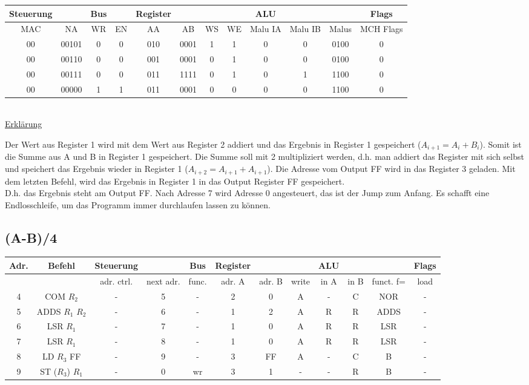 \documentclass[paper=a4, fontsize=11pt]{scrartcl}
\numberwithin{equation}{section}
\numberwithin{figure}{section}
\numberwithin{table}{section}
\begin{document}
\begin{tabular}{|cc|cc|cccc|ccc|c|}
\hline
Steuerung & & Bus & & Register & & & & ALU & & & Flags \\
\hline
MAC & NA & WR & EN & AA & AB & WS & WE & Malu IA & Malu IB & Malus & MCH Flags \\
\hline
00 & 00101 & 0 & 0 & 010 & 0001 & 1 & 1 & 0 & 0 & 0100 & 0 \\
\hline
00 & 00110 & 0 & 0 & 001 & 0001 & 0 & 1 & 0 & 0 & 0100 & 0 \\
\hline
00 & 00111 & 0 & 0 & 011 & 1111 & 0 & 1 & 0 & 1 & 1100 & 0 \\
\hline
00 & 00000 & 1 & 1 & 011 & 0001 & 0 & 0 & 0 & 0 & 1100 & 0 \\
\hline
\end{tabular} \\

\underline{Erklärung}

Der Wert aus Register 1 wird mit dem Wert aus Register 2 addiert und das Ergebnis in Register 1 gespeichert ($A_{i+1}=A_{i}+B_{i}$). Somit ist die Summe aus A und B in Register 1 gespeichert. Die Summe soll mit 2 multipliziert werden, d.h. man addiert das Register mit sich selbst und speichert das Ergebnis wieder in Register 1 ($A_{i+2}=A_{i+1}+A_{i+1}$). Die Adresse vom Output FF wird in das Register 3 geladen. Mit dem letzten Befehl, wird das Ergebnis in Register 1 in das Output Register FF gespeichert. \\
D.h. das Ergebnis steht am Output FF. Nach Adresse 7 wird Adresse 0 angesteuert, das ist der Jump zum Anfang. Es schafft eine Endlosschleife, um das Programm immer durchlaufen lassen zu können.


\subsection{(A-B)/4}

\begin{tabular}{|c|c|cc|c|ccc|ccc|c|}
\hline
Adr. & Befehl &Steuerung & & Bus & Register & & & ALU & & & Flags \\
\hline
& & adr. ctrl. & next adr. & func. & adr. A & adr. B & write & in A & in B & funct. f= & load \\
\hline
4 & COM $R_{2}$ & - & 5 & - & 2 & 0 & A & - & C & NOR & - \\
\hline
5 & ADDS $R_{1}$ $R_{2}$ & - & 6 & - & 1 & 2 & A & R & R & ADDS & - \\
\hline
6 & LSR $R_{1}$ & - & 7 & - & 1 &  0 & A & R & R & LSR & - \\
\hline
7 & LSR $R_{1}$ & - & 8 & - & 1 & 0 & A & R & R & LSR & - \\
\hline
8 & LD $R_{3}$ FF & - & 9 & - & 3 & FF & A & - & C & B & - \\
\hline
9 & ST ($R_{3}$) $R_{1}$ & - & 0 & wr & 3 & 1 & - & - & R & B & - \\
\hline
\end{tabular} \\
\end{document}
